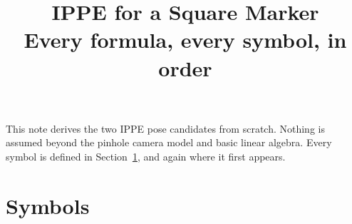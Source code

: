 \documentclass[11pt,a4paper]{article}
\title{IPPE for a Square Marker\\[0.3em]
       \large Every formula, every symbol, in order}
\date{}
\theoremstyle{remark}
\begin{document}
\maketitle

\noindent
This note derives the two IPPE pose candidates from scratch. Nothing is assumed
beyond the pinhole camera model and basic linear algebra. Every symbol is
defined in Section~\ref{sec:symbols}, and again where it first appears.

\tableofcontents

\section{Symbols}
\label{sec:symbols}
\end{document}
